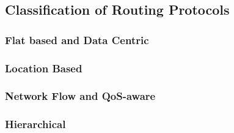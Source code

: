 \subsection{Classification of Routing Protocols}

\subsubsection{Flat based and Data Centric}

\subsubsection{Location Based}

\subsubsection{Network Flow and QoS-aware}

\subsubsection{Hierarchical}
